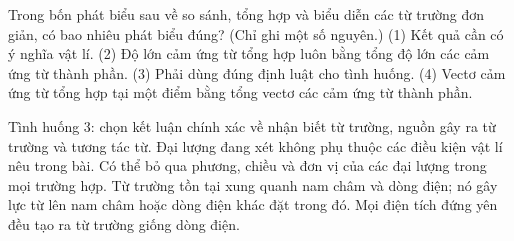 \begin{ex}
Trong bốn phát biểu sau về so sánh, tổng hợp và biểu diễn các từ trường đơn giản, có bao nhiêu phát biểu đúng? (Chỉ ghi một số nguyên.) (1) Kết quả cần có ý nghĩa vật lí. (2) Độ lớn cảm ứng từ tổng hợp luôn bằng tổng độ lớn các cảm ứng từ thành phần. (3) Phải dùng đúng định luật cho tình huống. (4) Vectơ cảm ứng từ tổng hợp tại một điểm bằng tổng vectơ các cảm ứng từ thành phần.
\end{ex}

\begin{ex}
Tình huống 3: chọn kết luận chính xác về nhận biết từ trường, nguồn gây ra từ trường và tương tác từ.
\choice
{Đại lượng đang xét không phụ thuộc các điều kiện vật lí nêu trong bài.}
{Có thể bỏ qua phương, chiều và đơn vị của các đại lượng trong mọi trường hợp.}
{\True Từ trường tồn tại xung quanh nam châm và dòng điện; nó gây lực từ lên nam châm hoặc dòng điện khác đặt trong đó.}
{Mọi điện tích đứng yên đều tạo ra từ trường giống dòng điện.}
\end{ex}

